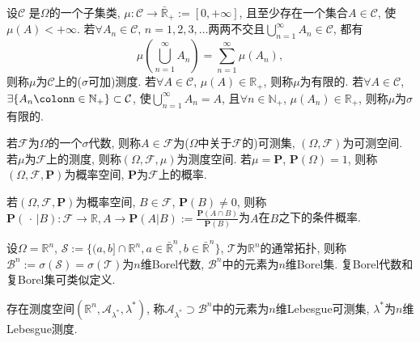 \begin{definition}
    设$\mathcal{C}$ 是$\Omega$的一个子集类, $\mu\colon\mathcal{C}\to\bar{\mathbb{R} }_+:=[0,+\infty]$, 且至少存在一个集合$A\in\mathcal{C}$, 使$\mu(A)<+\infty$. 若$\forall A_n\in\mathcal{C}$, $n=1,2,3,\dots$两两不交且$\bigcup_{n=1}^{\infty}A_n\in\mathcal{C}$, 都有\begin{equation*}
        \mu\left(\bigcup_{n=1}^{\infty}A_n\right)=\sum_{n=1}^{\infty}\mu\left(A_n\right),
    \end{equation*}则称$\mu$为$\mathcal{C}$上的($\sigma$可加)测度. 若$\forall A\in\mathcal{C}$, $\mu(A)\in\mathbb{R}_+$, 则称$\mu$为有限的. 若$\forall A\in\mathcal{C}$, $\exists\{A_n\colonn\in\mathbb{N}_+\}\subset\mathcal{C} $, 使$\bigcup_{n=1}^{\infty}A_n=A$, 且$\forall n\in\mathbb{N}_+$, $\mu(A_n)\in\mathbb{R}_+$, 则称$\mu$为$\sigma$有限的. 
\end{definition}

\begin{definition}
    若$\mathcal{F}$为$\Omega$的一个$\sigma$代数, 则称$A\in\mathcal{F}$为($\Omega$中关于$\mathcal{F}$的)可测集, $(\Omega,\mathcal{F})$为可测空间. 若$\mu$为$\mathcal{F}$上的测度, 则称$(\Omega,\mathcal{F},\mu)$为测度空间. 若$\mu=\mathbf{P}$, $\mathbf{P}(\Omega)=1$, 则称$(\Omega,\mathcal{F},\mathbf{P})$为概率空间, $\mathbf{P}$为$\mathcal{F}$上的概率.
\end{definition}

\begin{definition}
    若$(\Omega,\mathcal{F},\mathbf{P})$为概率空间, $B\in\mathcal{F}$, $\mathbf{P}(B)\ne 0$, 则称$\mathbf{P}(\,\cdot\,|B)\colon\mathcal{F}\to\mathbb{R}, A\to\mathbf{P}(A|B):=\frac{\mathbf{P}(A\cap B)}{\mathbf{P}(B)}$为$A$在$B$之下的条件概率.
\end{definition}

\begin{definition}
    设$\Omega=\mathbb{R}^n$, $\mathscr{S}:=\{(a,b]\cap\mathbb{R}^n,a\in\bar{\mathbb{R}}^n,b\in\bar{\mathbb{R}}^n\}$, $\mathscr{T}$为$\mathbb{R}^n$的通常拓扑, 则称$\mathscr{B}^n:=\sigma(\mathscr{S})=\sigma(\mathscr{T})$为$n$维Borel代数, $\mathscr{B}^n$中的元素为$n$维Borel集. 复Borel代数和复Borel集可类似定义.
\end{definition}

\begin{definition}
    存在测度空间$(\mathbb{R}^n,\mathscr{A}_{\lambda^*},\lambda^*)$, 称$\mathscr{A}_{\lambda^*}\!\!\supset\!\!\mathscr{B}^n$中的元素为$n$维Lebesgue可测集, $\lambda^*$为$n$维Lebesgue测度.
\end{definition}
